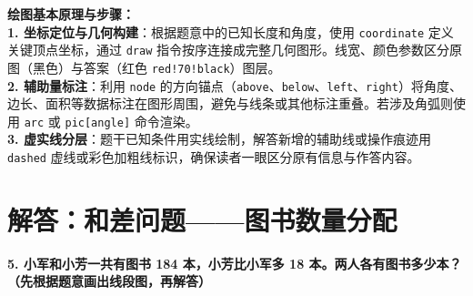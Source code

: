 \vspace{0.6cm}

{\small\color{blue!70!black}
\textbf{绘图基本原理与步骤：}\\
\textbf{1. 坐标定位与几何构建}：根据题意中的已知长度和角度，使用 \texttt{coordinate} 定义关键顶点坐标，通过 \texttt{draw} 指令按序连接成完整几何图形。线宽、颜色参数区分原图（黑色）与答案（红色 \texttt{red!70!black}）图层。\\
\textbf{2. 辅助量标注}：利用 \texttt{node} 的方向锚点（\texttt{above}、\texttt{below}、\texttt{left}、\texttt{right}）将角度、边长、面积等数据标注在图形周围，避免与线条或其他标注重叠。若涉及角弧则使用 \texttt{arc} 或 \texttt{pic[angle]} 命令渲染。\\
\textbf{3. 虚实线分层}：题干已知条件用实线绘制，解答新增的辅助线或操作痕迹用 \texttt{dashed} 虚线或彩色加粗线标识，确保读者一眼区分原有信息与作答内容。
}






\newpage

\section{解答：和差问题——图书数量分配}

\vspace{0.4cm}

\noindent\textbf{5. 小军和小芳一共有图书 184 本，小芳比小军多 18 本。两人各有图书多少本？（先根据题意画出线段图，再解答）}

\vspace{0.8cm}

